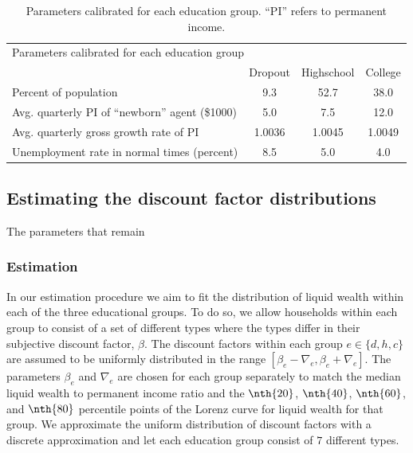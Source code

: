 \documentclass[11pt]{article}
\begin{document}
\begin{table}[th]
	\begin{center}
		\begin{tabular}{lccc}
			\toprule 
			\multicolumn{4}{l}{Parameters calibrated for each education group} \\ 
			& Dropout & Highschool & College \\ \midrule
			Percent of population & 9.3 & 52.7 & 38.0 \\ 
			Avg. quarterly PI of ``newborn'' agent (\$1000) & 5.0 & 7.5 & 12.0 \\
			Avg. quarterly gross growth rate of PI & 1.0036 & 1.0045 & 1.0049 \\
			Unemployment rate in normal times (percent) & 8.5 & 5.0 & 4.0  			
			\\ \bottomrule 
		\end{tabular}
		\caption{Parameters calibrated for each education group. ``PI'' refers to permanent income.}
		\label{tab:calibEd}
	\end{center}
\end{table}




\subsection{Estimating the discount factor distributions} 
\label{sec:estim}

The parameters that remain 

\subsubsection{Estimation} 

In our estimation procedure we aim to fit the distribution of liquid wealth within each of the three educational groups. To do so, we allow households within each group to consist of a set of different types where the types differ in their subjective discount factor, $\beta$. The discount factors within each group $e\in \{d, h, c\}$ are assumed to be uniformly distributed in the range $[\beta_e-\nabla_e, \beta_e+\nabla_e]$. The parameters $\beta_e$ and $\nabla_e$ are chosen for each group separately to match the median liquid wealth to permanent income ratio and the $\nth{20}$, $\nth{40}$, $\nth{60}$, and $\nth{80}$ percentile points of the Lorenz curve for liquid wealth for that group. We approximate the uniform distribution of discount factors with a discrete approximation and let each education group consist of $7$ different types.
\end{document}
